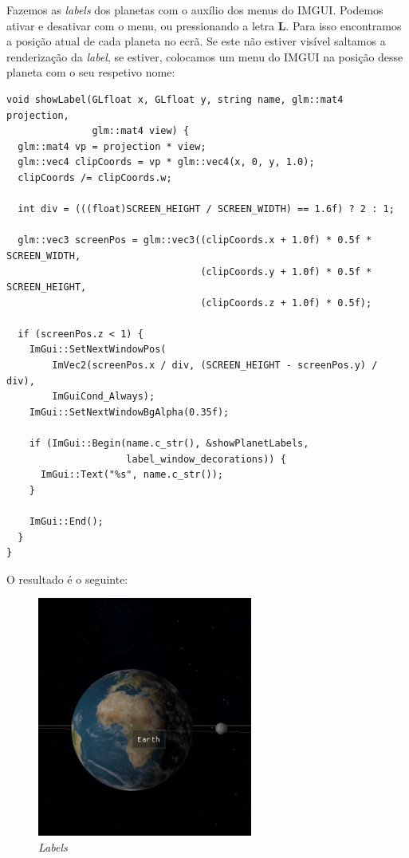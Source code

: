 \newpage

\noindent
Fazemos as \textit{labels} dos planetas com o auxílio dos menus do \ac{IMGUI}. Podemos ativar e desativar com o menu, ou pressionando a letra \textbf{L}. Para isso encontramos a posição atual de cada planeta no ecrã. Se este não estiver visível saltamos a renderização da \textit{label}, se estiver, colocamos um menu do \ac{IMGUI} na posição desse planeta com o seu respetivo nome:

\begin{lstlisting}[style=Cpp, caption=Labels]
void showLabel(GLfloat x, GLfloat y, string name, glm::mat4 projection,
               glm::mat4 view) {
  glm::mat4 vp = projection * view;
  glm::vec4 clipCoords = vp * glm::vec4(x, 0, y, 1.0);
  clipCoords /= clipCoords.w;

  int div = (((float)SCREEN_HEIGHT / SCREEN_WIDTH) == 1.6f) ? 2 : 1;

  glm::vec3 screenPos = glm::vec3((clipCoords.x + 1.0f) * 0.5f * SCREEN_WIDTH,
                                  (clipCoords.y + 1.0f) * 0.5f * SCREEN_HEIGHT,
                                  (clipCoords.z + 1.0f) * 0.5f);

  if (screenPos.z < 1) {
    ImGui::SetNextWindowPos(
        ImVec2(screenPos.x / div, (SCREEN_HEIGHT - screenPos.y) / div),
        ImGuiCond_Always);
    ImGui::SetNextWindowBgAlpha(0.35f);

    if (ImGui::Begin(name.c_str(), &showPlanetLabels,
                     label_window_decorations)) {
      ImGui::Text("%s", name.c_str());
    }

    ImGui::End();
  }
}   
\end{lstlisting}

\newpage
\noindent
O resultado é o seguinte:

\begin{figure}[H]
    \centering
    \includegraphics[width=200pt]{labels.png}
    \caption{\textit{Labels}}
\end{figure}

